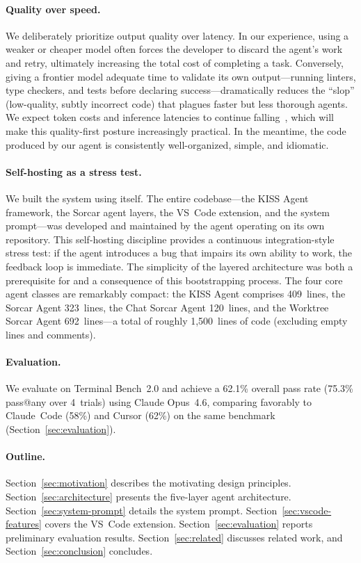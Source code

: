 \documentclass{article}
\begin{document}
\paragraph{Quality over speed.}
We deliberately prioritize output quality over latency.  In our
experience, using a weaker or cheaper model often forces the developer
to discard the agent's work and retry, ultimately increasing the total
cost of completing a task.  Conversely, giving a frontier model
adequate time to validate its own output---running linters, type
checkers, and tests before declaring success---dramatically reduces
the ``slop'' (low-quality, subtly incorrect code) that plagues
faster but less thorough agents.  We expect token costs and inference
latencies to continue falling~\citep{gao2025trae}, which will make
this quality-first posture increasingly practical.  In the meantime,
the code produced by our agent is consistently well-organized, simple,
and idiomatic.

\paragraph{Self-hosting as a stress test.}
We built the system using itself.  The entire codebase---the KISS
Agent framework, the Sorcar agent layers, the VS~Code extension, and
the system prompt---was developed and maintained by the agent operating
on its own repository.  This self-hosting discipline provides a
continuous integration-style stress test: if the agent introduces a
bug that impairs its own ability to work, the feedback loop is
immediate.  The simplicity of the layered architecture was both a
prerequisite for and a consequence of this bootstrapping process.
The four core agent classes are remarkably compact: the KISS Agent
comprises 409~lines, the Sorcar Agent 323~lines, the Chat Sorcar
Agent 120~lines, and the Worktree Sorcar Agent 692~lines---a total
of roughly 1,500~lines of code (excluding empty lines and comments).

\paragraph{Evaluation.}
We evaluate on Terminal Bench~2.0 and achieve a 62.1\% overall pass
rate (75.3\% pass@any over 4~trials) using Claude Opus~4.6, comparing
favorably to Claude~Code (58\%) and Cursor (62\%) on the same
benchmark (Section~\ref{sec:evaluation}).

\paragraph{Outline.}
Section~\ref{sec:motivation} describes the motivating design
principles.  Section~\ref{sec:architecture} presents the five-layer
agent architecture.  Section~\ref{sec:system-prompt} details the
system prompt.  Section~\ref{sec:vscode-features} covers the VS~Code
extension.  Section~\ref{sec:evaluation} reports preliminary
evaluation results.  Section~\ref{sec:related} discusses related work,
and Section~\ref{sec:conclusion} concludes.
\end{document}
